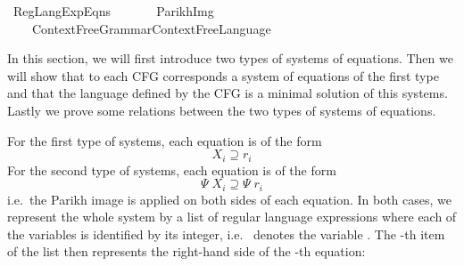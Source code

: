 %
\begin{isabellebody}%
%
%
\isadelimdocument
%
\endisadelimdocument
%
\isatagdocument
%
\isamarkuptrue%
%
\endisatagdocument
{\isafolddocument}%
%
\isadelimdocument
%
\endisadelimdocument
%
\isadelimtheory
%
\endisadelimtheory
%
\isatagtheory
{}\isamarkupfalse%
\ Reg{\isacharunderscore}{\kern0pt}Lang{\isacharunderscore}{\kern0pt}Exp{\isacharunderscore}{\kern0pt}Eqns\isanewline
\ \ \isanewline
\ \ \ \ {\isachardoublequoteopen}Parikh{\isacharunderscore}{\kern0pt}Img{\isachardoublequoteclose}\isanewline
\ \ \ \ {\isachardoublequoteopen}Context{\isacharunderscore}{\kern0pt}Free{\isacharunderscore}{\kern0pt}Grammar{\isachardot}{\kern0pt}Context{\isacharunderscore}{\kern0pt}Free{\isacharunderscore}{\kern0pt}Language{\isachardoublequoteclose}\isanewline
{}%
\endisatagtheory
{\isafoldtheory}%
%
\isadelimtheory
%
\endisadelimtheory
%
\begin{isamarkuptext}%
In this section, we will first introduce two types of systems of
equations. Then we will show that to each CFG corresponds a system of equations of the first type 
and that the language defined by the CFG is a minimal solution of this systems. Lastly we prove
some relations between the two types of systems of equations.%
\end{isamarkuptext}\isamarkuptrue%
%
\isadelimdocument
%
\endisadelimdocument
%
\isatagdocument
%
\isamarkuptrue%
%
\endisatagdocument
{\isafolddocument}%
%
\isadelimdocument
%
\endisadelimdocument
%
\begin{isamarkuptext}%
For the first type of systems, each equation is of the form
\[X_i \supseteq r_i\]
For the second type of systems, each equation is of the form
\[\Psi \; X_i \supseteq \Psi \; r_i\]
i.e.\ the Parikh image is applied on both sides of each equation.
In both cases, we represent the whole system by a list of regular language expressions where each
of the variables  is identified by its integer, i.e.\  denotes the variable
. The -th item of the list then represents the right-hand side  of the -th equation:%

\end{isamarkuptext}
\end{isabellebody}
